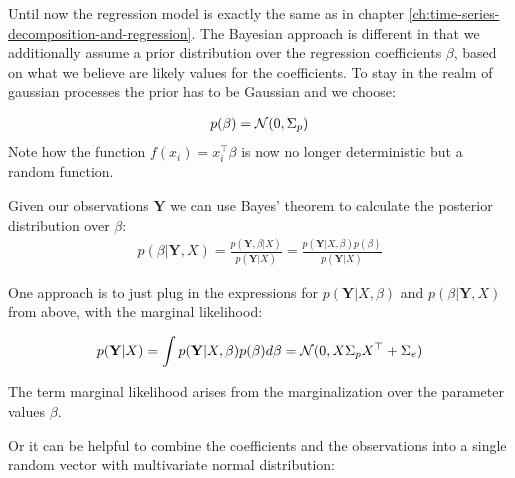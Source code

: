 Until now the regression model is exactly the same as in chapter \ref{ch:time-series-decomposition-and-regression}.
The Bayesian approach is different in that we additionally assume a prior distribution over the
regression coefficients $\beta$, based on what we believe are likely values for the coefficients.
To stay in the realm of gaussian processes the prior has to be Gaussian and we choose:

\begin{gather*}
    p(\beta) = \operatorname{\mathcal{N}}(0, \Sigma_p)
\end{gather*}
Note how the function $f(x_i)=x_i^{\top}\beta$ is now no longer deterministic but a random function.

Given our observations $\mathbf{Y}$  we can use Bayes' theorem to calculate the posterior distribution over $\beta$:
\begin{gather*}
    p(\beta| \mathbf{Y}, X) = \frac{p(\mathbf{Y},\beta|X)}{p(\mathbf{Y}|X)} =
    \frac{p(\mathbf{Y}|X,\beta)p(\beta)}{p(\mathbf{Y}|X)}
\end{gather*}

One approach is to just plug in the expressions for
$p(\mathbf{Y}|X,\beta)$ and $p(\beta|\mathbf{Y}, X)$ from above, with the marginal likelihood:

\begin{gather}\label{eq:marginal-likelihood}
    p(\mathbf{Y}|X) = \int p(\mathbf{Y}|X,\beta) p(\beta) d\beta = \operatorname{\mathcal{N}}(0, X \Sigma_p X^{\top} + \Sigma_e)
\end{gather}

The term marginal likelihood arises from the marginalization over the parameter values $\beta$.

Or it can be helpful to combine the coefficients and the observations into a single random vector with
multivariate normal distribution:

